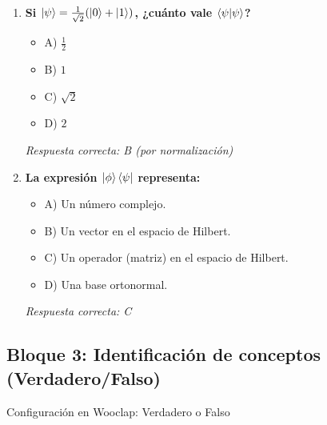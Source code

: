 \documentclass{unirTema}
\begin{document}
\begin{enumerate}
  \item \textbf{Si $\ket{\psi} = \frac{1}{\sqrt{2}}(\ket{0} + \ket{1})$, ¿cuánto vale $\braket{\psi}{\psi}$?}
        \begin{itemize}
          \item A) $\frac{1}{2}$
          \item B) $1$
          \item C) $\sqrt{2}$
          \item D) $2$
        \end{itemize}
        \textit{Respuesta correcta: B (por normalización)}

  \item \textbf{La expresión $\ket{\phi}\bra{\psi}$ representa:}
        \begin{itemize}
          \item A) Un número complejo.
          \item B) Un vector en el espacio de Hilbert.
          \item C) Un operador (matriz) en el espacio de Hilbert.
          \item D) Una base ortonormal.
        \end{itemize}
        \textit{Respuesta correcta: C}
\end{enumerate}

\subsection*{Bloque 3: Identificación de conceptos (Verdadero/Falso)}

Configuración en Wooclap: Verdadero o Falso
\end{document}
